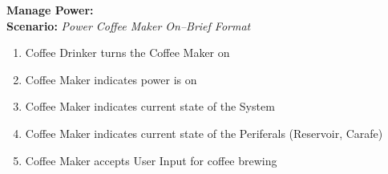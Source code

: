 \documentclass[letterpaper]{article}
\begin{document}
\noindent
\textbf{Manage Power: }\\
\textbf{Scenario:  }
\textit{Power Coffee Maker On--Brief Format}
\begin{enumerate}
\item Coffee Drinker turns the Coffee Maker on
\item Coffee Maker indicates power is on
\item Coffee Maker indicates current state of the System
\item Coffee Maker indicates current state of the Periferals (Reservoir, Carafe) 
\item Coffee Maker accepts User Input for coffee brewing

\end{enumerate}
\end{document}
